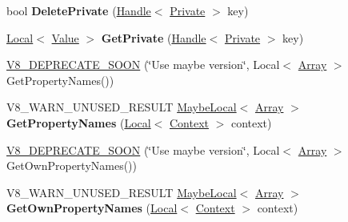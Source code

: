 \begin{DoxyCompactItemize}
\item 
\hypertarget{classv8_1_1_object_a4751605ba0c560846832783efca46c71}{}bool {\bfseries Delete\+Private} (\hyperlink{classv8_1_1_local}{Handle}$<$ \hyperlink{classv8_1_1_private}{Private} $>$ key)\label{classv8_1_1_object_a4751605ba0c560846832783efca46c71}

\item 
\hypertarget{classv8_1_1_object_a6d99ef0c7c505f1b7182f9fc11f373b0}{}\hyperlink{classv8_1_1_local}{Local}$<$ \hyperlink{classv8_1_1_value}{Value} $>$ {\bfseries Get\+Private} (\hyperlink{classv8_1_1_local}{Handle}$<$ \hyperlink{classv8_1_1_private}{Private} $>$ key)\label{classv8_1_1_object_a6d99ef0c7c505f1b7182f9fc11f373b0}

\item 
\hyperlink{classv8_1_1_object_a3f735ad2eab826ddc5eba467ce624acb}{V8\+\_\+\+D\+E\+P\+R\+E\+C\+A\+T\+E\+\_\+\+S\+O\+O\+N} (\char`\"{}Use maybe version\char`\"{}, Local$<$ \hyperlink{classv8_1_1_array}{Array} $>$ Get\+Property\+Names())
\item 
\hypertarget{classv8_1_1_object_a771be1943535959085da5c384f8e6405}{}V8\+\_\+\+W\+A\+R\+N\+\_\+\+U\+N\+U\+S\+E\+D\+\_\+\+R\+E\+S\+U\+L\+T \hyperlink{classv8_1_1_maybe_local}{Maybe\+Local}$<$ \hyperlink{classv8_1_1_array}{Array} $>$ {\bfseries Get\+Property\+Names} (\hyperlink{classv8_1_1_local}{Local}$<$ \hyperlink{classv8_1_1_context}{Context} $>$ context)\label{classv8_1_1_object_a771be1943535959085da5c384f8e6405}

\item 
\hyperlink{classv8_1_1_object_aa72e9d0d22d1d4a4c4b63827a5469d40}{V8\+\_\+\+D\+E\+P\+R\+E\+C\+A\+T\+E\+\_\+\+S\+O\+O\+N} (\char`\"{}Use maybe version\char`\"{}, Local$<$ \hyperlink{classv8_1_1_array}{Array} $>$ Get\+Own\+Property\+Names())
\item 
\hypertarget{classv8_1_1_object_ab4f1fc692a02c11d749a7d5120e67026}{}V8\+\_\+\+W\+A\+R\+N\+\_\+\+U\+N\+U\+S\+E\+D\+\_\+\+R\+E\+S\+U\+L\+T \hyperlink{classv8_1_1_maybe_local}{Maybe\+Local}$<$ \hyperlink{classv8_1_1_array}{Array} $>$ {\bfseries Get\+Own\+Property\+Names} (\hyperlink{classv8_1_1_local}{Local}$<$ \hyperlink{classv8_1_1_context}{Context} $>$ context)\label{classv8_1_1_object_ab4f1fc692a02c11d749a7d5120e67026}


\end{DoxyCompactItemize}
